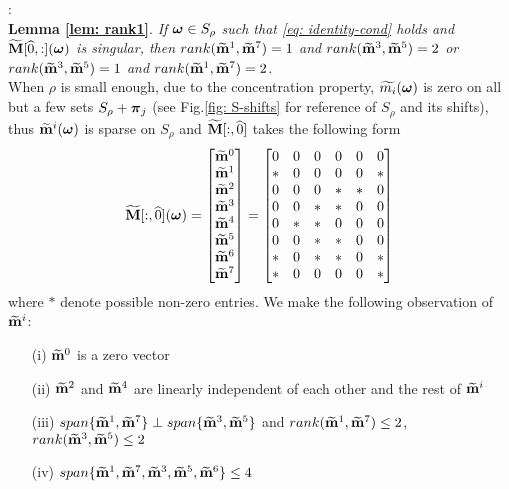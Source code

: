:\\[.2em]
{\bf Lemma \ref{lem: rank1}}. {\it 
If $\boldsymbol{\omega}\in S_\rho$ such that \eqref{eq: identity-cond} holds and $\widetilde{\mathbf{M}}[\widehat{0},:](\boldsymbol{\omega})$ is singular, then  $rank(\widetilde{\mathbf{m}}^{1},\widetilde{\mathbf{m}}^{7}) = 1$ and $rank(\widetilde{\mathbf{m}}^{3},\widetilde{\mathbf{m}}^{5}) = 2$ or $rank(\widetilde{\mathbf{m}}^{3},\widetilde{\mathbf{m}}^{5}) = 1$ and $rank(\widetilde{\mathbf{m}}^{1},\widetilde{\mathbf{m}}^{7}) = 2$.
}\\[1em]
When $\rho$ is small enough, due to the concentration property, $\widetilde{m_{i}}(\boldsymbol{\omega})$ is zero on all but a few sets $S_\rho + \boldsymbol{\pi}_j$ (see Fig.\ref{fig: S-shifts} for reference of $S_\rho$ and its shifts), thus $\widetilde{\mathbf{m}}^{i}(\boldsymbol{\omega})$ is sparse on $S_\rho$ and $\widetilde{\mathbf{M}}[:,\widehat{0}]$ takes the following form
\begin{align}
\label{eq: sparse-mat}
\M[:,\widehat{0}](\V{\omega})=
\begin{bmatrix}
\mrow{0}\\
\mrow{1}\\
\mrow{2}\\
\mrow{3}\\
\mrow{4}\\
\mrow{5}\\
\mrow{6}\\
\mrow{7}
\end{bmatrix}
=
\begin{bmatrix}
0 & 0 & 0 & 0 & 0 & 0\\
* & 0 & 0 & 0 & 0 & *\\
0 & 0 & 0 & * & * & 0\\
0 & 0 & * & * & 0 & 0\\
0 & * & * & 0 & 0 & 0\\
0 & 0 & * & * & 0 & 0\\
* & 0 & * & * & 0 & *\\
* & 0 & 0 & 0 & 0 & *
\end{bmatrix}
\end{align}
where $*$ denote possible non-zero entries.
We make the following observation of $\widetilde{\mathbf{m}}^{i}$:
\begin{itemize}
\item[(i)] $\widetilde{\mathbf{m}}^{0}$ is a zero vector
\item[(ii)] $\widetilde{\mathbf{m}}^{2}$ and $\widetilde{\mathbf{m}}^{4}$ are linearly independent of each other and the rest of $\widetilde{\mathbf{m}}^{i}$
\item[(iii)] $span\{\widetilde{\mathbf{m}}^{1},\widetilde{\mathbf{m}}^{7}\} \perp span\{\widetilde{\mathbf{m}}^{3},\widetilde{\mathbf{m}}^{5}\}$ and $rank(\widetilde{\mathbf{m}}^{1},\widetilde{\mathbf{m}}^{7}) \leq 2$, \\$rank(\widetilde{\mathbf{m}}^{3},\widetilde{\mathbf{m}}^{5})\leq 2$
\item[(iv)] $span\{\widetilde{\mathbf{m}}^{1}, \widetilde{\mathbf{m}}^{7}, \widetilde{\mathbf{m}}^{3},\widetilde{\mathbf{m}}^{5},\widetilde{\mathbf{m}}^{6}\} \leq 4$
\end{itemize}
